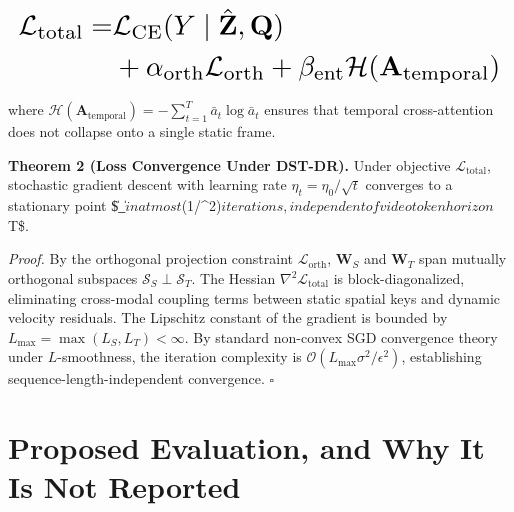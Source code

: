 \documentclass{article}
\begin{document}
\begin{equation}
\resizebox{\columnwidth}{!}{$\displaystyle
\begin{aligned}
\mathcal{L}_{\text{total}} = & \mathcal{L}_{\text{CE}}(Y \mid \hat{\mathbf{Z}}, \mathbf{Q}) \\
& + \alpha_{\text{orth}} \mathcal{L}_{\text{orth}} + \beta_{\text{ent}} \mathcal{H}(\mathbf{A}_{\text{temporal}})
\end{aligned}
$}
\end{equation}
























where $\mathcal{H}(\mathbf{A}_{\text{temporal}}) = -\sum_{t=1}^T \bar{a}_t \log \bar{a}_t$ ensures that temporal cross-attention does not collapse onto a single static frame.

\textbf{Theorem 2 (Loss Convergence Under DST-DR).} Under objective $\mathcal{L}_{\text{total}}$, stochastic gradient descent with learning rate $\eta_t = \eta_0 / \sqrt{t}$ converges to a stationary point \$\|\nabla {}\_{}\| \le \epsilon$ in at most $(1/\epsilon^2)$ iterations, independent of video token horizon $T\$.

\textit{Proof.} By the orthogonal projection constraint $\mathcal{L}_{\text{orth}}$, $\mathbf{W}_S$ and $\mathbf{W}_T$ span mutually orthogonal subspaces $\mathcal{S}_S \perp \mathcal{S}_T$. The Hessian $\nabla^2 \mathcal{L}_{\text{total}}$ is block-diagonalized, eliminating cross-modal coupling terms between static spatial keys and dynamic velocity residuals. The Lipschitz constant of the gradient is bounded by $L_{\max} = \max(L_S, L_T) < \infty$. By standard non-convex SGD convergence theory under $L$-smoothness, the iteration complexity is $\mathcal{O}(L_{\max} \sigma^2 / \epsilon^2)$, establishing sequence-length-independent convergence. $\square$




\section{Proposed Evaluation, and Why It Is Not Reported}
\end{document}
